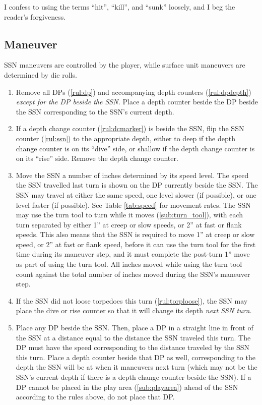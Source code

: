 \documentclass[../TacSubMicroRules.tex]{subfiles}
\begin{document}
\begin{design}
    I confess to using the terms ``hit'', ``kill'', and ``sunk'' loosely, and I beg the reader's forgiveness.
\end{design}

\subsection{Maneuver}%
\label{sub:maneuver}

SSN maneuvers are controlled by the player, while surface unit maneuvers are determined by die rolls.

 
\begin{enumerate}
    \item Remove all DPs (\ref{rul:dp}) and accompanying depth counters (\ref{rul:dpdepth}) \emph{except for the DP beside the SSN.}
      Place a depth counter beside the DP beside the SSN corresponding to the SSN's current depth.
    \item If a depth change counter (\ref{rul:dcmarker}) is beside the SSN, flip the SSN counter (\ref{rul:ssn}) to the appropriate depth, either to deep if the depth change counter is on its ``dive'' side, or shallow if the depth change counter is on its ``rise'' side.
      Remove the depth change counter.
    \item Move the SSN a number of inches determined by its speed level.
      The speed the SSN travelled last turn is shown on the DP currently beside the SSN.
      The SSN may travel at either the same speed, one level slower (if possible), or one level faster (if possible).
      See Table \ref{tab:speed} for movement rates. 
      The SSN may use the turn tool to turn while it moves (\ref{sub:turn_tool}), with each turn separated by either 1'' at creep or slow speeds, or 2'' at fast or flank speeds.
      This also means that the SSN is required to move 1'' at creep or slow speed, or 2'' at fast or flank speed, before it can use the turn tool for the first time during its maneuver step, and it must complete the post-turn 1'' move as part of using the turn tool.
      All inches moved while using the turn tool count against the total number of inches moved during the SSN's maneuver step.
    \item If the SSN did not loose torpedoes this turn (\ref{rul:torploose}), the SSN may place the dive or rise counter so that it will change its depth \emph{next SSN turn.}
    \item Place any DP beside the SSN.
      Then, place a DP in a straight line in front of the SSN at a distance equal to the distance the SSN traveled this turn.
      The DP must have the speed corresponding to the distance traveled by the SSN this turn.
      Place a depth counter beside that DP as well, corresponding to the depth the SSN will be at when it maneuvers next turn (which may not be the SSN's current depth if there is a depth change counter beside the SSN).
      If a DP cannot be placed in the play area (\ref{sub:playarea}) ahead of the SSN according to the rules above, do not place that DP.
\end{enumerate}
\end{document}
